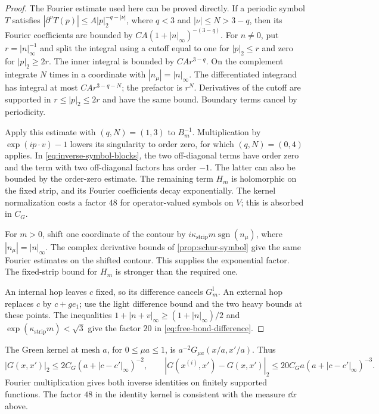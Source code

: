 \begin{proof}
The Fourier estimate used here can be proved directly. If a periodic
symbol $T$ satisfies
$|\partial^\nu T(p)|\le A|p|_2^{-q-|\nu|}$, where $q<3$ and
$|\nu|\le N>3-q$, then its Fourier coefficients are bounded by
$C A(1+|n|_\infty)^{-(3-q)}$. For $n\ne0$, put
$r=|n|_\infty^{-1}$ and split the integral using a cutoff equal to
one for $|p|_2\le r$ and zero for $|p|_2\ge2r$. The inner integral
is bounded by $CA r^{3-q}$. On the complement integrate $N$ times in
a coordinate with $|n_\mu|=|n|_\infty$. The differentiated integrand
has integral at most $CA r^{3-q-N}$; the prefactor is $r^N$.
Derivatives of the cutoff are supported in $r\le|p|_2\le2r$ and have
the same bound. Boundary terms cancel by periodicity.

Apply this estimate with $(q,N)=(1,3)$ to $B_m^{-1}$. Multiplication
by $\exp(ip\cdot v)-1$ lowers its singularity to order zero, for which
$(q,N)=(0,4)$ applies. In \eqref{eq:inverse-symbol-blocks}, the two
off-diagonal terms have order zero and the term with two off-diagonal
factors has order $-1$. The latter can also be bounded by the
order-zero estimate. The remaining term $H_m$ is holomorphic on the
fixed strip, and its Fourier coefficients decay exponentially.
The kernel normalization costs a factor $48$ for operator-valued
symbols on $V$; this is absorbed in $C_G$.

For $m>0$, shift one coordinate of the contour by
$i\kappa_{\mathrm{strip}}m\operatorname{sgn}(n_\mu)$, where
$|n_\mu|=|n|_\infty$. The complex derivative bounds of
\cref{prop:schur-symbol} give the same Fourier estimates
on the shifted contour. This supplies the exponential factor.
The fixed-strip bound for $H_m$ is stronger than the required one.

An internal hop leaves $c$ fixed, so its difference cancels
$G_m^{\mathrm l}$. An external hop replaces $c$ by $c+ge_1$; use the
light difference bound and the two heavy bounds at these points.
The inequalities $1+|n+v|_\infty\ge(1+|n|_\infty)/2$ and
$\exp(\kappa_{\mathrm{strip}}m)<\sqrt3$ give the factor $20$ in
\eqref{eq:free-bond-difference}.
\end{proof}

The Green kernel at mesh $a$, for $0\le\mu a\le1$, is
$a^{-2}G_{\mu a}(x/a,x'/a)$. Thus
\begin{equation}\label{eq:mesh-free-kernel}
 |G(x,x')|_2\le2C_G(a+|c-c'|_\infty)^{-2},\qquad
 |G(x^{(i)},x')-G(x,x')|_2
       \le20C_Ga(a+|c-c'|_\infty)^{-3}.
\end{equation}
Fourier multiplication gives both inverse identities on finitely
supported functions. The factor $48$ in the identity kernel is
consistent with the measure $\dd x$ above.

